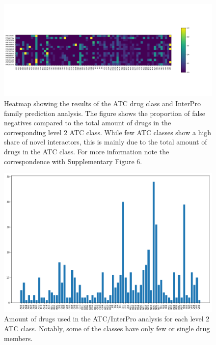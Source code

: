 \documentclass[]{article}
\begin{document}
\clearpage
\begin{figure}[ht]%
	\centerline{\includegraphics[width=1.1\textwidth]{../figures/ATC_Interpro_heatmap.png}}
	\caption{Heatmap showing the results of the ATC drug class and InterPro family prediction analysis. The figure shows the proportion of false negatives compared to the total amount of drugs in the corresponding level 2 ATC class. While few ATC classes show a high share of novel interactors, this is mainly due to the total amount of drugs in the ATC class. For more information note the correspondence with Supplementary Figure 6.}
	\label{fig:ATCInterproHeatmap}
\end{figure}

\clearpage

\begin{figure}[ht]%
	\centerline{\includegraphics[width=1\textwidth]{../figures/ATC_bar_distr.png}}
	\caption{Amount of drugs used in the ATC/InterPro analysis for each level 2 ATC class. Notably, some of the classes have only few or single drug members.}
	\label{fig:ATCdistribution}
\end{figure}
\end{document}
